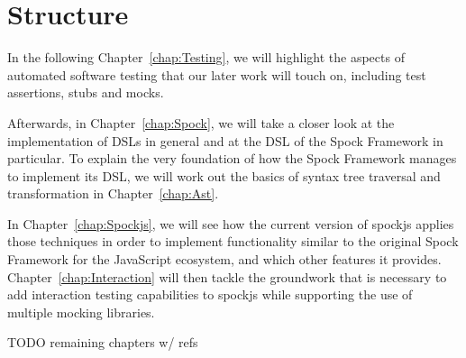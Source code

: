 \section{Structure}
In the following Chapter~\ref{chap:Testing},
we will highlight the aspects of automated software testing
that our later work will touch on,
including test assertions, stubs and mocks.

Afterwards, in Chapter~\ref{chap:Spock},
we will take a closer look at the implementation of DSLs in general
and at the DSL of the Spock Framework in particular.
To explain the very foundation of how the Spock Framework
manages to implement its DSL,
we will work out the basics of
syntax tree traversal and transformation
in Chapter~\ref{chap:Ast}.

In Chapter~\ref{chap:Spockjs},
we will see how the current version of spockjs
applies those techniques in order to
implement functionality similar to the original Spock Framework
for the JavaScript ecosystem,
and which other features it provides.
Chapter~\ref{chap:Interaction}
will then tackle the groundwork that is necessary
to add interaction testing capabilities to spockjs
while supporting the use of multiple mocking libraries.

TODO remaining chapters w/ refs

